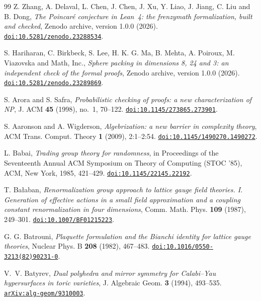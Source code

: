 \begin{thebibliography}{99}
Z. Zhang, A. Delaval, L. Chen, J. Chen, J. Xu, Y. Liao, J. Jiang, C. Liu and B. Dong,
\emph{The Poincar\'e conjecture in Lean~4: the frenzymath formalization, built and checked},
Zenodo archive, version 1.0.0 (2026).
\href{https://doi.org/10.5281/zenodo.23288534}{\nolinkurl{doi:10.5281/zenodo.23288534}}.

S. Hariharan, C. Birkbeck, S. Lee, H. K. G. Ma, B. Mehta, A. Poiroux, M. Viazovska and Math, Inc.,
\emph{Sphere packing in dimensions 8, 24 and 3: an independent check of the formal proofs},
Zenodo archive, version 1.0.0 (2026).
\href{https://doi.org/10.5281/zenodo.23289869}{\nolinkurl{doi:10.5281/zenodo.23289869}}.

S. Arora and S. Safra,
\emph{Probabilistic checking of proofs: a new characterization of NP},
J. ACM \textbf{45} (1998), no.~1, 70--122.
\href{https://doi.org/10.1145/273865.273901}{\nolinkurl{doi:10.1145/273865.273901}}.

S. Aaronson and A. Wigderson,
\emph{Algebrization: a new barrier in complexity theory},
ACM Trans. Comput. Theory \textbf{1} (2009), 2:1--2:54.
\href{https://doi.org/10.1145/1490270.1490272}{\nolinkurl{doi:10.1145/1490270.1490272}}.

L. Babai,
\emph{Trading group theory for randomness},
in Proceedings of the Seventeenth Annual ACM Symposium on Theory of Computing (STOC '85), ACM, New York, 1985, 421--429.
\href{https://doi.org/10.1145/22145.22192}{\nolinkurl{doi:10.1145/22145.22192}}.

T. Ba{\l}aban,
\emph{Renormalization group approach to lattice gauge field theories. I. Generation of effective actions in a small field approximation and a coupling constant renormalization in four dimensions},
Comm. Math. Phys. \textbf{109} (1987), 249--301.
\href{https://doi.org/10.1007/BF01215223}{\nolinkurl{doi:10.1007/BF01215223}}.

G. G. Batrouni,
\emph{Plaquette formulation and the Bianchi identity for lattice gauge theories},
Nuclear Phys. B \textbf{208} (1982), 467--483.
\href{https://doi.org/10.1016/0550-3213(82)90231-0}{\nolinkurl{doi:10.1016/0550-3213(82)90231-0}}.

V.~V. Batyrev,
\emph{Dual polyhedra and mirror symmetry for Calabi--Yau hypersurfaces in toric varieties},
J. Algebraic Geom. \textbf{3} (1994), 493--535.
\href{https://arxiv.org/abs/alg-geom/9310003}{\nolinkurl{arXiv:alg-geom/9310003}}.


\end{thebibliography}
